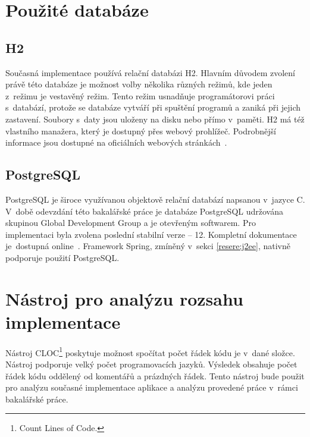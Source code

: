 \section{Použité databáze}\label{resere:databaze}

    \subsection{H2}
        Současná implementace používá relační databázi H2. Hlavním důvodem zvolení právě této databáze je možnost volby několika různých režimů, kde jeden z~režimu je vestavěný režim. Tento režim usnadňuje programátorovi práci s~databází, protože se databáze vytváří při spuštění programů a zaniká při jejich zastavení. Soubory s~daty jsou uloženy na disku nebo přímo v~paměti. H2 má též vlastního manažera, který je dostupný přes webový prohlížeč. Podrobnější informace jsou dostupné na oficiálních webových stránkách~\cite{h2-doc}.
        
    \subsection{PostgreSQL}
        PostgreSQL je široce využívanou objektově relační databází napsanou v~jazyce C. V~době odevzdání této bakalářské práce je databáze PostgreSQL udržována skupinou Global Development Group a je otevřeným softwarem. Pro implementaci byla zvolena poslední stabilní verze -- 12. Kompletní dokumentace je~dostupná online~\cite{postgres-documentation}. Framework Spring, zmíněný v~sekci \ref{resere:j2ee}, nativně podporuje použití PostgreSQL.
        

\section{Nástroj pro analýzu rozsahu implementace}\label{reserse:cloc}
    Nástroj CLOC\footnote{Count Lines of Code.}\cite{cloc-download} poskytuje možnost spočítat počet řádek kódu je v~dané složce. Nástroj podporuje velký počet programovacích jazyků. Výsledek obsahuje počet řádek kódu oddělený od komentářů a prázdných řádek. Tento nástroj bude použit pro analýzu současné implementace aplikace a analýzu provedené práce v~rámci bakalářské práce.